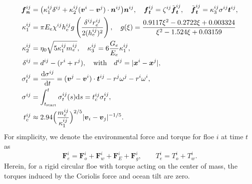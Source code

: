 \documentclass[a4paper,11pt]{article}
\numberwithin{equation}{section}
\theoremstyle{definition}
\newcommand{\bfx}{\boldsymbol{x}}
\newcommand{\bfv}{\boldsymbol{v}}
\newcommand{\bfn}{\boldsymbol{n}}
\newcommand{\bft}{\boldsymbol{t}}
\newcommand{\bff}{\boldsymbol{f}}
\newcommand{\bfF}{\boldsymbol{F}}
\def\d{{  \rm d}}
\begin{document}
\begin{subequations}\label{eq:demparm}
\begin{align} 
    \bff_{\bfn}^{ij} & = \big( \kappa^{ij}_1 \delta^{ij} + \kappa^{ij}_2 (\bfv^i  - \bfv^j )\cdot\bfn^{ij} \big) \bfn^{ij}, \quad
     \bff_{\bft}^{ij}  = \zeta^{ij} \tilde{\bff}_{\bft}^{ij}, \quad  \tilde{\bff}_{\bft}^{ij} = \kappa^{ij}_3 \sigma^{ij} \bft^{ij}, \label{eq:prmfnft} \\
     \kappa^{ij}_1 & = \pi E_e \chi^{ij} h^{ij}_e g\left(\frac{ \delta^{ij} r_e^{ij}}{2(h^{ij}_e)^2} \right), \quad g(\xi) = \frac{0.9117\xi^2 - 0.2722\xi + 0.003324}{\xi^2 - 1.524\xi + 0.03159} \label{eq:prmk1g} \\
     \kappa^{ij}_2 & = \eta_0 \sqrt{ 5 \kappa^{ij}_1 m^{ij}_e}, \quad \kappa^{ij}_3 = 6 \frac{G_e}{E_e}\kappa^{ij}_1,  \label{eq:prmk2k3} \\
     \delta^{ij} & = d^{ij} - (r^i+r^j), 
    \quad\mbox{with}\quad d^{ij} = |\bfx^i-\bfx^j|, \label{eq:prmdelt} \\
     \sigma^{ij}_t & = \frac{\d \sigma^{ij}}{\d t} = (\bfv^j - \bfv^i)\cdot\bft^{ij} - r^j\omega^j - r^i\omega^i, \label{eq:prmsigt} \\ 
     \sigma^{ij} & = \int_{t_\text{start}}^t \sigma^{ij}_t(s) \d s  = t_c^{ij} \sigma^{ij}_t, \label{eq:prmsig} \\
     t_c^{ij} & \approx 2.94 \Big(\frac{m_e^{ij}}{\kappa_1^{ij}} \Big)^{2/5} |\bfv_i - \bfv_j|^{-1/5}.  \label{eq:prmtc}
\end{align}
\end{subequations}
%
For simplicity, we denote the environmental force and torque for floe $i$ at time $t$ as
\begin{equation}
    \label{eq:envft}
    \bfF^i_e = \bfF^i_o + \bfF^i_w + \bfF^i_E + \bfF^i_g, \qquad T^i_e = T^i_o +T^i_w.
\end{equation}
Herein, for a rigid circular floe with torque acting on the center of mass, the torques induced by the Coriolis force and ocean tilt are zero. 
\end{document}
